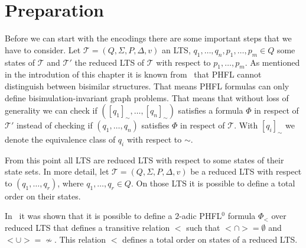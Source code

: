 \section{Preparation}\label{sec:lower_bounds_preparation}

Before we can start with the encodings there are some important steps that we have to consider.  Let $\mathcal{T} = (Q, 
\Sigma, P, \Delta, v)$ an LTS, $q_1, \dots, q_n, p_1, \dots, p_m \in Q$ some states of $\mathcal{T}$ and $\mathcal{T}'$ the 
reduced LTS of $\mathcal{T}$ with respect to $p_1, \dots, p_m$.  
As mentioned in the introdution of this chapter it is known from~\cite{lange2014capturing} that PHFL cannot distinguish 
between bisimilar structures. That means PHFL formulas can only define bisimulation-invariant graph problems. That means that without loss of generality we can check if $([q_1]_\sim, \dots, [q_n]_\sim)$ satisfies a formula $\Phi$ in respect of $\mathcal{T}'$ instead of checking if $(q_1, \dots, q_n)$ satisfies 
$\Phi$ in respect of $\mathcal{T}$. With $[q_i]_\sim$ we denote the equivalence class of $q_i$ with respect to $\sim$.

From this point all LTS are reduced LTS with respect to some states of their state sets. In more detail, let $\mathcal{T} = (Q, \Sigma, P, \Delta, v)$ be a reduced LTS with respect to $(q_1, \dots, q_r)$, where $q_1, \dots, q_r \in Q$. On those LTS it is possible to define a total order on their states. 

\begin{remark} \label{remark:transitive_relation}
    In~\cite{otto1999bisimulation} it was shown that it is possible to define a $2$-adic PHFL$^0$ formula $\Phi_<$ over reduced LTS that defines a
    transitive relation $<$ such that $< \cap > = \emptyset$ and $< \cup > = \not\sim$. This relation $<$ defines a total
    order on states of a reduced LTS.
\end{remark}